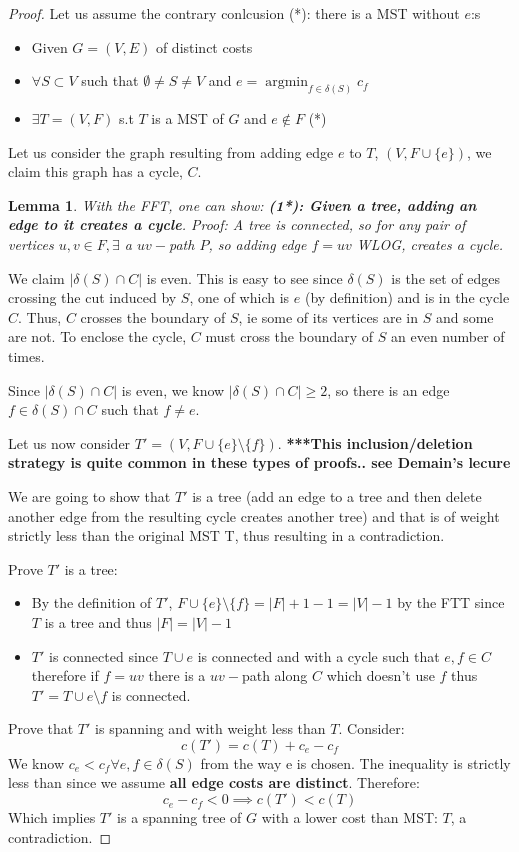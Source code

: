 \documentclass{article}
\newtheorem{lemma}{Lemma}
\DeclareMathOperator*{\argmin}{argmin} %
\begin{document}
\begin{proof}
Let us assume the contrary conlcusion (*): there is a MST without $e$:s
\begin{itemize}
    \item Given $G=(V,E)$ of distinct costs
    \item $\forall S \subset V$ such that $\emptyset \neq S \neq V$ and $e = \argmin_{f \in \delta(S)} c_f $ 
    \item $ \exists T=(V, F)$ s.t $T$ is a MST of $G$ and $e \not \in F$ (*)
\end{itemize}

Let us consider the graph resulting from adding edge $e$ to $T$, $(V, F \cup \{e\})$, we claim this graph has a cycle, $C$.

\begin{lemma}
With the FFT, one can show: \textbf{(1*): Given a tree, adding an edge to it creates a cycle}. \textit{Proof:} A tree is connected, so for any pair of vertices $u,v\in F, \exists$ a $uv-$path $P$, so adding edge $f=uv$ WLOG, creates a cycle. 
\end{lemma}

We claim $|\delta(S) \cap C|$ is even. This is easy to see since $\delta(S)$ is the set of edges crossing the cut induced by $S$, one of which is $e$ (by definition) and is in the cycle $C$. Thus, $C$ crosses the boundary of $S$, ie some of its vertices are in $S$ and some are not. To enclose the cycle, $C$ must cross the boundary of $S$ an even number of times.

Since $|\delta(S) \cap C|$ is even, we know $|\delta(S) \cap C| \geq 2$, so there is an edge $f \in \delta(S) \cap C$ such that $f \neq e$.


Let us now consider $T' = (V, F \cup \{ e \} \setminus \{ f \})$. \textbf{***This inclusion/deletion strategy is quite common in these types of proofs.. see Demain's lecure}

We are going to show that $T'$ is a tree (add an edge to a tree and then delete another  edge from the resulting cycle creates another tree) and that is of weight strictly less than the original MST T, thus resulting in a contradiction. 

Prove $T'$ is a tree: 
\begin{itemize}
\item By the definition of $T'$, $F \cup \{ e \} \setminus \{ f \} = |F| + 1 -1 = |V|-1$ by the FTT since $T$ is a tree and thus $|F| = |V|-1$
\item $T'$ is connected since $T \cup {e}$ is connected and with a cycle such that $e,f\in C$ therefore if $f=uv$ there is a $uv-$path along $C$ which doesn't use $f$ thus $T' = T \cup {e} \setminus f$ is connected. 
\end{itemize}

Prove that $T'$ is spanning and with weight less than $T$.
Consider: 
\[ c(T') = c(T) + c_e - c_f \]
We know $c_e < c_f \forall e,f \in \delta(S)$ from the way e is chosen. The inequality is strictly less than since we assume \textbf{all edge costs are distinct}. Therefore:
\[ c_e-c_f < 0 \implies c(T') < c(T) \]
Which implies $T'$ is a spanning tree of $G$ with a lower cost than MST: $T$, a contradiction.  
\end{proof}
\end{document}
